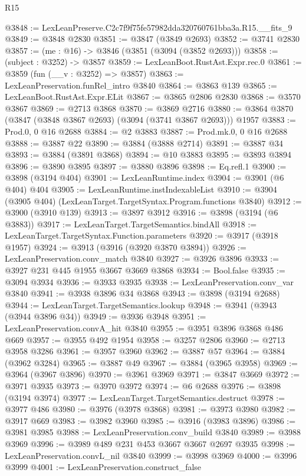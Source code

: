 \begin{lexlean}{R15}
\begin{coremodule}
@3848 := LexLeanPreserve.C2c7f9f75fe57982dda320760761bba3a.R15.__fits_9
@3849 := @3848 @2830
@3851 := @3847 (@3849 @2693)
@3852 := @3741 @2830
@3857 := (me : @16) -> @3846 (@3851 (@3094 (@3852 @2693)))
@3858 := (subject : @3252) -> @3857
@3859 := LexLeanBoot.RustAst.Expr.rec.{0}
@3861 := @3859 (fun (__v : @3252) => @3857)
@3863 := LexLeanPreservation.funRel_intro @3840
@3864 := @3863 @139
@3865 := LexLeanBoot.RustAst.Expr.ELit
@3867 := @3865 @2806 @2830
@3868 := @3570 @3867
@3869 := @2713 @3868
@3870 := @3869 @2716
@3880 := @3864 @3870 (@3847 (@3848 @3867 @2693) (@3094 (@3741 @3867 @2693))) @1957
@3883 := Prod.{0, 0} @16 @2688
@3884 := @2 @3883
@3887 := Prod.mk.{0, 0} @16 @2688
@3888 := @3887 @22
@3890 := @3884 (@3888 @2714)
@3891 := @3887 @34
@3893 := @3884 (@3891 @3868)
@3894 := @10 @3883
@3895 := @3893 @3894
@3896 := @3890 @3895
@3897 := @3880 @3896
@3898 := Eq.refl.{1}
@3900 := @3898 (@3194 @404)
@3901 := LexLeanRuntime.index
@3904 := @3901 (@6 @404) @404
@3905 := LexLeanRuntime.instIndexableList
@3910 := @3904 (@3905 @404) (LexLeanTarget.TargetSyntax.Program.functions @3840)
@3912 := @3900 (@3910 @139)
@3913 := @3897 @3912
@3916 := @3898 (@3194 (@6 @3883))
@3917 := LexLeanTarget.TargetSemantics.bindAll
@3918 := LexLeanTarget.TargetSyntax.Function.parameters
@3920 := @3917 (@3918 @1957)
@3924 := @3913 (@3916 (@3920 @3870 @3894))
@3926 := LexLeanPreservation.conv_match @3840
@3927 := @3926 @3896
@3933 := @3927 @231 @445 @1955 @3667 @3669 @3868
@3934 := Bool.false
@3935 := @3094 @3934
@3936 := @3933 @3935
@3938 := LexLeanPreservation.conv_var @3840
@3941 := @3938 @3896 @34 @3868
@3943 := @3898 (@3194 @2688)
@3944 := LexLeanTarget.TargetSemantics.lookup
@3948 := @3941 (@3943 (@3944 @3896 @34))
@3949 := @3936 @3948
@3951 := LexLeanPreservation.convA_hit @3840
@3955 := @3951 @3896 @3868 @486 @669
@3957 := @3955 @492 @1954
@3958 := @3257 @2806
@3960 := @2713 @3958 @3286
@3961 := @3957 @3960
@3962 := @3887 @57
@3964 := @3884 (@3962 @3284)
@3965 := @3887 @49
@3967 := @3884 (@3965 @3958)
@3969 := @3964 (@3967 @3896)
@3970 := @3961 @3969
@3971 := @3847 @3669
@3972 := @3971 @3935
@3973 := @3970 @3972
@3974 := @6 @2688
@3976 := @3898 (@3194 @3974)
@3977 := LexLeanTarget.TargetSemantics.destruct
@3978 := @3977 @486
@3980 := @3976 (@3978 @3868)
@3981 := @3973 @3980
@3982 := @3917 @669
@3983 := @3982 @3960
@3985 := @3916 (@3983 @3896)
@3986 := @3981 @3985
@3988 := LexLeanPreservation.conv_build @3840
@3989 := @3988 @3969
@3996 := @3989 @489 @231 @453 @3667 @3667 @2697 @3935
@3998 := LexLeanPreservation.convL_nil @3840
@3999 := @3998 @3969
@4000 := @3996 @3999
@4001 := LexLeanPreservation.construct_false

\end{coremodule}
\end{lexlean}
